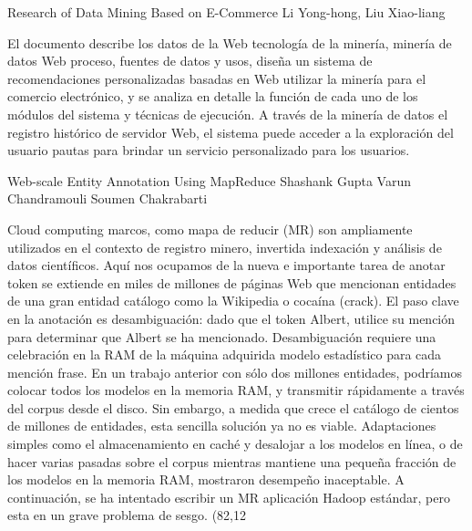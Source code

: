 Research of Data Mining Based on E-Commerce
Li Yong-hong,
Liu Xiao-liang

El documento describe los datos de la Web tecnología de la minería, minería de datos Web proceso, fuentes de datos y usos, diseña un sistema de recomendaciones personalizadas basadas en Web utilizar la minería para el comercio electrónico, y se analiza en detalle la función de cada uno de los módulos del sistema y técnicas de ejecución. A través de la minería de datos el registro histórico de servidor Web, el sistema puede acceder a la exploración del usuario pautas para brindar un servicio personalizado para los usuarios.


Web-scale Entity Annotation Using MapReduce
Shashank Gupta
Varun Chandramouli
Soumen Chakrabarti

Cloud computing marcos, como mapa de reducir (MR) son ampliamente utilizados en el contexto de registro minero, invertida indexación y análisis de datos científicos. Aquí nos ocupamos de la nueva e importante tarea de anotar token se extiende en miles de millones de páginas Web que mencionan entidades de una gran entidad catálogo como la Wikipedia o cocaína (crack).  El paso clave en la anotación es desambiguación: dado que el token Albert, utilice su mención para determinar que Albert se ha mencionado. Desambiguación requiere una celebración en la RAM de la máquina adquirida modelo estadístico para cada mención frase. En un trabajo anterior con sólo dos millones entidades, podríamos colocar todos los modelos en la memoria RAM, y transmitir rápidamente a través del corpus desde el disco. Sin embargo, a medida que crece el catálogo de cientos de millones de entidades, esta sencilla solución ya no es viable. Adaptaciones simples como el almacenamiento en caché y desalojar a los modelos en línea, o de hacer varias pasadas sobre el corpus mientras mantiene una pequeña fracción de los modelos en la memoria RAM, mostraron desempeño inaceptable. A continuación, se ha intentado escribir un MR aplicación Hadoop estándar, pero esta en un grave problema de sesgo.  (82,12 %


